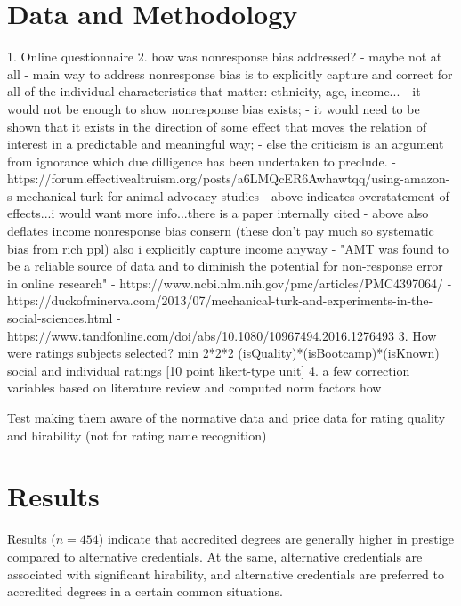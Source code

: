 \documentclass[review]{elsarticle}
\begin{document}
\section{Data and Methodology}

1. Online questionnaire
2. how was nonresponse bias addressed? - maybe not at all
- main way to address nonresponse bias is to explicitly capture and correct for all of the individual characteristics that matter: ethnicity, age, income...
- it would not be enough to show nonresponse bias exists;
- it would need to be shown that it exists in the direction of some effect that moves the relation of interest in a predictable and meaningful way;
- else the criticism is an argument from ignorance which due dilligence has been undertaken to preclude.
- https://forum.effectivealtruism.org/posts/a6LMQcER6Awhawtqq/using-amazon-s-mechanical-turk-for-animal-advocacy-studies
- above indicates overstatement of effects...i would want more info...there is a paper internally cited
- above also deflates income nonresponse bias consern (these don't pay much so systematic bias from rich ppl) also i explicitly capture income anyway
- "AMT was found to be a reliable source of data and to diminish the potential for non-response error in online research"
- https://www.ncbi.nlm.nih.gov/pmc/articles/PMC4397064/
- https://duckofminerva.com/2013/07/mechanical-turk-and-experiments-in-the-social-sciences.html
- https://www.tandfonline.com/doi/abs/10.1080/10967494.2016.1276493
3. How were ratings subjects selected? min 2*2*2 (isQuality)*(isBootcamp)*(isKnown) social and individual ratings [10 point likert-type unit]
4. a few correction variables based on literature review and computed norm factors how

Test making them aware of the normative data and price data for rating quality and hirability (not for rating name recognition)

\section{Results}


Results ($n = 454$) indicate that accredited degrees are generally higher in prestige compared to alternative credentials.
At the same, alternative credentials are associated with significant hirability,
and alternative credentials are preferred to accredited degrees in a certain common situations.
\end{document}

